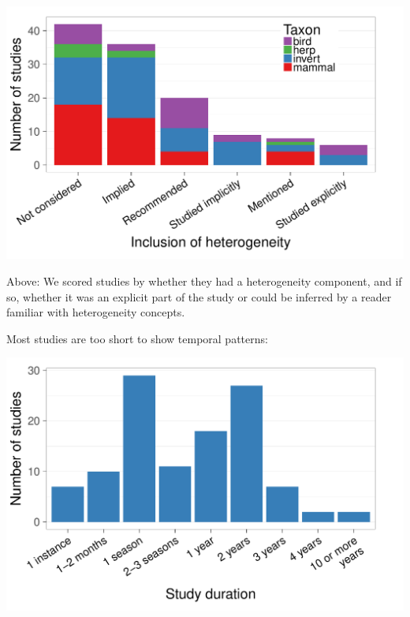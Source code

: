 \documentclass[final]{beamer}\usepackage[]{graphicx}\usepackage[]{color}
\makeatletter
\def\maxwidth{ %
  \ifdim\Gin@nat@width>\linewidth
    \linewidth
  \else
    \Gin@nat@width
  \fi
}
\newenvironment{knitrout}{}{} %
\newlength{\onecolwid}
\makeatother
\begin{document}
\begin{frame}[t]
\begin{columns}[t]
\begin{column}{\onecolwid}
\begin{knitrout}
\includegraphics[width=\maxwidth]{figure/beamer-heterogeneity-1} \hfill{}



\end{knitrout}
\vspace{-1cm}
Above: We scored studies by whether they had a heterogeneity component, and if so, whether it was an explicit part of the study or could be inferred by a reader familiar with heterogeneity concepts.

\vskip 1cm

Most studies are too short to show temporal patterns:

\begin{knitrout}
\color{fgcolor}

\includegraphics[width=\maxwidth]{figure/beamer-duration-1} \hfill{}



\end{knitrout}
\vskip 1cm 





\end{column} %

\end{columns} %

\end{frame} %
\end{document}
